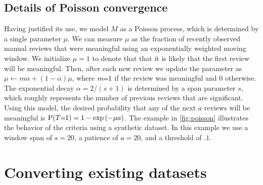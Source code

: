 \subsection{Details of Poisson convergence}

Having justified its use, we model $M$ as a Poisson process, which is determined by a single parameter $\mu$.
We can measure $\mu$ as the fraction of recently observed manual reviews that were meaningful using an
  exponentially weighted moving window.
We initialize $\mu=1$ to denote that that it is likely that the first review will be meaningful.
Then, after each new review we update the parameter as %
$\mu \leftarrow m \alpha + (1 - \alpha) \mu$, where $m\mkern-6mu=\mkern-6mu1$ if the review was meaningful and $0$ otherwise.
The exponential decay $\alpha = 2 / (s + 1)$ is determined by a span parameter $s$, which roughly represents the
  number of previous reviews that are significant.
Using this model, the desired probability that any of the next $a$ reviews will be meaningful is %
$\mathbin{\operatorname{P}}(T\mkern-6mu=\mkern-6mu1) = 1 - \textrm{exp}\left(-\mu  a\right)$.
The example in \cref{fig:poisson} illustrates the behavior of the criteria using a synthetic dataset.
In this example we use a window span of $s=20$, a patience of $a=20$, and a threshold of $.1$.




\poisson{}
  






\section{Converting existing datasets}\label{sec:rename}

